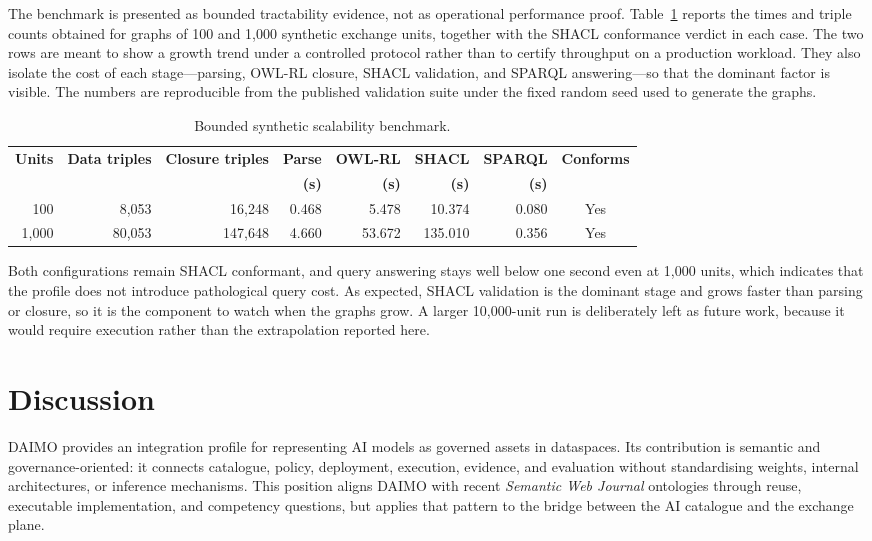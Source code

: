 \documentclass[Afour,sagev,times]{sagej}
\begin{document}
The benchmark is presented as bounded tractability evidence, not as operational performance proof. Table~\ref{tab:scalability} reports the times and triple counts obtained for graphs of 100 and 1,000 synthetic exchange units, together with the SHACL conformance verdict in each case. The two rows are meant to show a growth trend under a controlled protocol rather than to certify throughput on a production workload. They also isolate the cost of each stage---parsing, OWL-RL closure, SHACL validation, and SPARQL answering---so that the dominant factor is visible. The numbers are reproducible from the published validation suite under the fixed random seed used to generate the graphs.

\begin{table}[tb]
\scriptsize\sf\centering
\caption{Bounded synthetic scalability benchmark.\label{tab:scalability}}
\begin{tabular}{@{}r r r r r r r c@{}}
\toprule
\textbf{Units} & \textbf{Data triples} & \textbf{Closure triples} & \textbf{Parse} & \textbf{OWL-RL} & \textbf{SHACL} & \textbf{SPARQL} & \textbf{Conforms} \\
 & & & \textbf{(s)} & \textbf{(s)} & \textbf{(s)} & \textbf{(s)} & \\
\midrule
100 & 8,053 & 16,248 & 0.468 & 5.478 & 10.374 & 0.080 & Yes \\
1,000 & 80,053 & 147,648 & 4.660 & 53.672 & 135.010 & 0.356 & Yes \\
\bottomrule
\end{tabular}
\end{table}

Both configurations remain SHACL conformant, and query answering stays well below one second even at 1,000 units, which indicates that the profile does not introduce pathological query cost. As expected, SHACL validation is the dominant stage and grows faster than parsing or closure, so it is the component to watch when the graphs grow. A larger 10,000-unit run is deliberately left as future work, because it would require execution rather than the extrapolation reported here.

\section{Discussion}\label{sec:discussion}

DAIMO provides an integration profile for representing AI models as governed assets in dataspaces. Its contribution is semantic and governance-oriented: it connects catalogue, policy, deployment, execution, evidence, and evaluation without standardising weights, internal architectures, or inference mechanisms. This position aligns DAIMO with recent \emph{Semantic Web Journal} ontologies through reuse, executable implementation, and competency questions, but applies that pattern to the bridge between the AI catalogue and the exchange plane.
\end{document}
